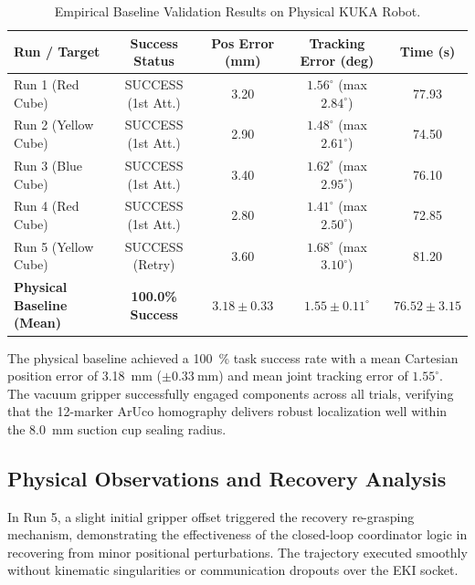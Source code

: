 \documentclass[runningheads]{llncs}
\begin{document}
\begin{table}[tb]
\caption{Empirical Baseline Validation Results on Physical KUKA Robot.}
\label{tab:benchmark_summary}
\centering
\begin{tabular}{lcccc}
\toprule
\textbf{Run / Target} & \textbf{Success Status} & \textbf{Pos Error (mm)} & \textbf{Tracking Error (deg)} & \textbf{Time (s)} \\
\midrule
Run 1 (Red Cube) & SUCCESS (1st Att.) & 3.20 & $1.56^\circ$ (max $2.84^\circ$) & 77.93 \\
Run 2 (Yellow Cube) & SUCCESS (1st Att.) & 2.90 & $1.48^\circ$ (max $2.61^\circ$) & 74.50 \\
Run 3 (Blue Cube) & SUCCESS (1st Att.) & 3.40 & $1.62^\circ$ (max $2.95^\circ$) & 76.10 \\
Run 4 (Red Cube) & SUCCESS (1st Att.) & 2.80 & $1.41^\circ$ (max $2.50^\circ$) & 72.85 \\
Run 5 (Yellow Cube) & SUCCESS (Retry) & 3.60 & $1.68^\circ$ (max $3.10^\circ$) & 81.20 \\
\midrule
\textbf{Physical Baseline (Mean)} & \textbf{100.0\% Success} & $\mathbf{3.18 \pm 0.33}$ & $\mathbf{1.55 \pm 0.11^\circ}$ & $\mathbf{76.52 \pm 3.15}$ \\
\bottomrule
\end{tabular}
\end{table}

The physical baseline achieved a \SI{100}{\percent} task success rate with a mean Cartesian position error of \SI{3.18}{\milli\meter} ($\pm\SI{0.33}{\milli\meter}$) and mean joint tracking error of $1.55^\circ$. The vacuum gripper successfully engaged components across all trials, verifying that the 12-marker ArUco homography delivers robust localization well within the \SI{8.0}{\milli\meter} suction cup sealing radius.

\subsection{Physical Observations and Recovery Analysis}
In Run 5, a slight initial gripper offset triggered the recovery re-grasping mechanism, demonstrating the effectiveness of the closed-loop coordinator logic in recovering from minor positional perturbations. The trajectory executed smoothly without kinematic singularities or communication dropouts over the EKI socket.

\end{document}
